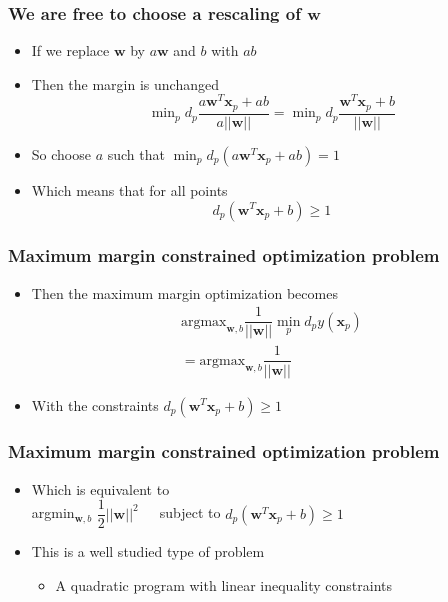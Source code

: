 \documentclass[12pt,notes,mathserif]{beamer}
\begin{document}
\begin{frame}[c]
\frametitle{We are free to choose a rescaling of $\bm{w}$}
\begin{itemize}
\item If we replace $\bm{w}$ by $a\bm{w}$ and $b$ with $ab$
\item Then the margin is unchanged
\[
\min\nolimits_pd_p\dfrac{a\bm{w}^T\bm{x}_p+ab}{a||\bm{w}||}=
\min\nolimits_pd_p
\dfrac{\bm{w}^T\bm{x}_p+b}{||\bm{w}||}
\]
\item So choose $a$ such that $\min_pd_p(a\bm{w}^T\bm{x}_p+ab)=1$
\item Which means that for all points 
\[
d_p(\bm{w}^T\bm{x}_p+b)\geqslant{}1
\]
\end{itemize}
\end{frame}


\begin{frame}[c]
\frametitle{Maximum margin constrained optimization problem}
\begin{itemize}
\item Then the maximum margin optimization becomes
\[
\begin{array}{c}
\text{argmax}_{\bm{w},b}\dfrac{1}{||\bm{w}||} \min_pd_py(\bm{x}_p)\\
= \text{argmax}_{\bm{w},b}\dfrac{1}{||\bm{w}||}
\end{array}
\]
\item With the constraints $d_p(\bm{w}^T\bm{x}_p+b)\geqslant{}1$
\end{itemize}
\end{frame}

\begin{frame}[c]
\frametitle{Maximum margin constrained optimization problem}
\begin{itemize}
\item Which is equivalent to \\
argmin$_{\bm{w},b}$ $\dfrac{1}{2}||\bm{w}||^2$~~~subject to $d_p(\bm{w}^T\bm{x}_p+b)\geqslant{}1$
\item This is a well studied type of problem
\begin{itemize}
\item A quadratic program with linear inequality constraints
\end{itemize}
\end{itemize}
\end{frame}
\end{document}
